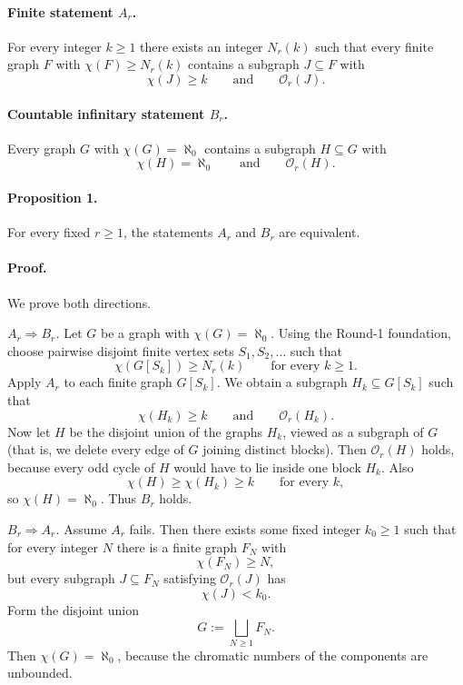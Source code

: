 \paragraph{Finite statement $A_r$.}
For every integer $k\ge 1$ there exists an integer $N_r(k)$ such that every finite graph $F$ with $\chi(F)\ge N_r(k)$ contains a subgraph $J\subseteq F$ with
\[
\chi(J)\ge k \qquad \text{and} \qquad \mathcal O_r(J).
\]

\paragraph{Countable infinitary statement $B_r$.}
Every graph $G$ with $\chi(G)=\aleph_0$ contains a subgraph $H\subseteq G$ with
\[
\chi(H)=\aleph_0 \qquad \text{and} \qquad \mathcal O_r(H).
\]

\paragraph{Proposition 1.} For every fixed $r\ge 1$, the statements $A_r$ and $B_r$ are equivalent.

\paragraph{Proof.}
We prove both directions.

\smallskip
\noindent\emph{$A_r\Rightarrow B_r$.}
Let $G$ be a graph with $\chi(G)=\aleph_0$. Using the Round-1 foundation, choose pairwise disjoint finite vertex sets $S_1,S_2,\dots$ such that
\[
\chi(G[S_k])\ge N_r(k) \qquad \text{for every } k\ge 1.
\]
Apply $A_r$ to each finite graph $G[S_k]$. We obtain a subgraph $H_k\subseteq G[S_k]$ such that
\[
\chi(H_k)\ge k \qquad \text{and} \qquad \mathcal O_r(H_k).
\]
Now let $H$ be the disjoint union of the graphs $H_k$, viewed as a subgraph of $G$ (that is, we delete every edge of $G$ joining distinct blocks). Then $\mathcal O_r(H)$ holds, because every odd cycle of $H$ would have to lie inside one block $H_k$. Also
\[
\chi(H)\ge \chi(H_k)\ge k \qquad \text{for every } k,
\]
so $\chi(H)=\aleph_0$. Thus $B_r$ holds.

\smallskip
\noindent\emph{$B_r\Rightarrow A_r$.}
Assume $A_r$ fails. Then there exists some fixed integer $k_0\ge 1$ such that for every integer $N$ there is a finite graph $F_N$ with
\[
\chi(F_N)\ge N,
\]
but every subgraph $J\subseteq F_N$ satisfying $\mathcal O_r(J)$ has
\[
\chi(J)<k_0.
\]
Form the disjoint union
\[
G:=\bigsqcup_{N\ge 1} F_N.
\]
Then $\chi(G)=\aleph_0$, because the chromatic numbers of the components are unbounded.

